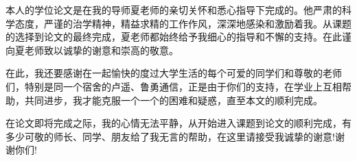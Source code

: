 

\begin{ack}
本人的学位论文是在我的导师夏老师的亲切关怀和悉心指导下完成的。他严肃的科学态度，严谨的治学精神，精益求精的工作作风，深深地感染和激励着我。从课题的选择到论文的最终完成，夏老师都始终给予我细心的指导和不懈的支持。在此谨向夏老师致以诚挚的谢意和崇高的敬意。

在此，我还要感谢在一起愉快的度过大学生活的每个可爱的同学们和尊敬的老师们，特别是同一个宿舍的卢遥、鲁勇通信，正是由于你们的支持，在学业上互相帮助，共同进步，我才能克服一个一个的困难和疑惑，直至本文的顺利完成。

在论文即将完成之际，我的心情无法平静，从开始进入课题到论文的顺利完成，有多少可敬的师长、同学、朋友给了我无言的帮助，在这里请接受我诚挚的谢意!谢谢你们!

\end{ack}
